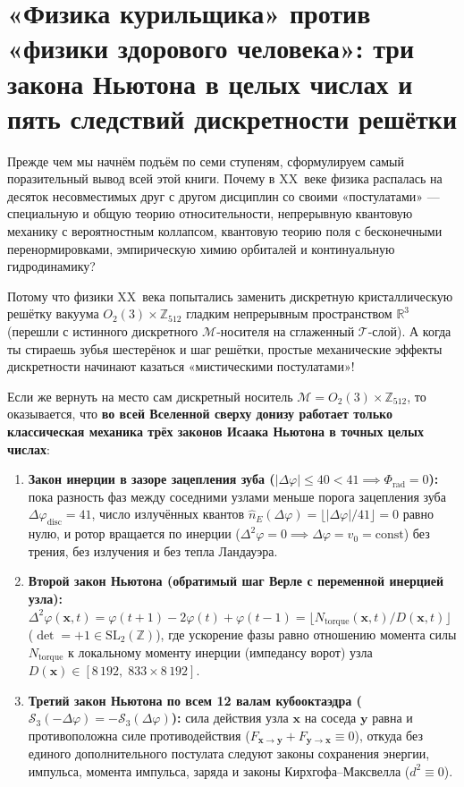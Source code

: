 \section*{«Физика курильщика» против «физики здорового человека»: три закона Ньютона в целых числах и пять следствий дискретности решётки}

Прежде чем мы начнём подъём по семи ступеням, сформулируем самый поразительный вывод всей этой книги. Почему в XX~веке физика распалась на десяток несовместимых друг с другом дисциплин со своими «постулатами» --- специальную и общую теорию относительности, непрерывную квантовую механику с вероятностным коллапсом, квантовую теорию поля с бесконечными перенормировками, эмпирическую химию орбиталей и континуальную гидродинамику?

Потому что физики XX~века попытались заменить дискретную кристаллическую решётку вакуума $O_2(3)\times\mathbb{Z}_{512}$ гладким непрерывным пространством $\mathbb{R}^3$ (перешли с истинного дискретного $\mathcal{M}$-носителя на сглаженный $\mathcal{T}$-слой). А когда ты стираешь зубья шестерёнок и шаг решётки, простые механические эффекты дискретности начинают казаться «мистическими постулатами»!

Если же вернуть на место сам дискретный носитель $\mathcal{M} = O_2(3)\times\mathbb{Z}_{512}$, то оказывается, что \textbf{во всей Вселенной сверху донизу работает только классическая механика трёх законов Исаака Ньютона в точных целых числах}:
\begin{enumerate}[label=\textbf{Закон Ньютона \Roman*.},leftmargin=*,noitemsep]
\item \textbf{Закон инерции в зазоре зацепления зуба ($|\Delta\varphi|\le 40 < 41 \implies \Phi_{\mathrm{rad}} = 0$):}
  пока разность фаз между соседними узлами меньше порога зацепления зуба $\Delta\varphi_{\mathrm{disc}} = 41$, число излучённых квантов $\hat{n}_E(\Delta\varphi) = \lfloor|\Delta\varphi|/41\rfloor = 0$ равно нулю, и ротор вращается по инерции ($\Delta^2\varphi = 0 \implies \Delta\varphi = v_0 = \mathrm{const}$) без трения, без излучения и без тепла Ландауэра.
\item \textbf{Второй закон Ньютона (обратимый шаг Верле с переменной инерцией узла):}
  $\Delta^2\varphi(\mathbf{x},t) = \varphi(t+1)-2\varphi(t)+\varphi(t-1) = \lfloor N_{\mathrm{torque}}(\mathbf{x},t)/D(\mathbf{x},t)\rfloor$ ($\det = +1\in\mathrm{SL}_2(\mathbb{Z})$), где ускорение фазы равно отношению момента силы $N_{\mathrm{torque}}$ к локальному моменту инерции (импедансу ворот) узла $D(\mathbf{x})\in[8\,192,\; 833\times 8\,192]$.
\item \textbf{Третий закон Ньютона по всем 12 валам кубооктаэдра ($\mathcal{S}_3(-\Delta\varphi) = -\mathcal{S}_3(\Delta\varphi)$):}
  сила действия узла $\mathbf{x}$ на соседа $\mathbf{y}$ равна и противоположна силе противодействия ($F_{\mathbf{x}\to\mathbf{y}} + F_{\mathbf{y}\to\mathbf{x}} \equiv 0$), откуда без единого дополнительного постулата следуют законы сохранения энергии, импульса, момента импульса, заряда и законы Кирхгофа--Максвелла ($d^2\equiv 0$).
\end{enumerate}

